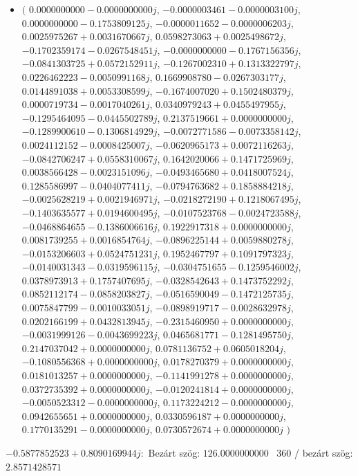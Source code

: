 \documentclass[14pt,a4paper]{article}
\begin{document}
\begin{itemize}
\item
$\big($
$0.0000000000-0.0000000000j$, $-0.0000003461-0.0000003100j$, $0.0000000000-0.1753809125j$, $-0.0000011652-0.0000006203j$, $0.0025975267+0.0031670667j$, $0.0598273063+0.0025498672j$, $-0.1702359174-0.0267548451j$, $-0.0000000000-0.1767156356j$, $-0.0841303725+0.0572152911j$, $-0.1267002310+0.1313322797j$, $0.0226462223-0.0050991168j$, $0.1669908780-0.0267303177j$, $0.0144891038+0.0053308599j$, $-0.1674007020+0.1502480379j$, $0.0000719734-0.0017040261j$, $0.0340979243+0.0455497955j$, $-0.1295464095-0.0445502789j$, $0.2137519661+0.0000000000j$, $-0.1289900610-0.1306814929j$, $-0.0072771586-0.0073358142j$, $0.0024112152-0.0008425007j$, $-0.0620965173+0.0072116263j$, $-0.0842706247+0.0558310067j$, $0.1642020066+0.1471725969j$, $0.0038566428-0.0023151096j$, $-0.0493465680+0.0418007524j$, $0.1285586997-0.0404077411j$, $-0.0794763682+0.1858884218j$, $-0.0025628219+0.0021946971j$, $-0.0218272190+0.1218067495j$, $-0.1403635577+0.0194600495j$, $-0.0107523768-0.0024723588j$, $-0.0468864655-0.1386006616j$, $0.1922917318+0.0000000000j$, $0.0081739255+0.0016854764j$, $-0.0896225144+0.0059880278j$, $-0.0153206603+0.0524751231j$, $0.1952467797+0.1091797323j$, $-0.0140031343-0.0319596115j$, $-0.0304751655-0.1259546002j$, $0.0378973913+0.1757407695j$, $-0.0328542643+0.1473752292j$, $0.0852112174-0.0858203827j$, $-0.0516590049-0.1472125735j$, $0.0075847799-0.0010033051j$, $-0.0898919717-0.0028632978j$, $0.0202166199+0.0432813945j$, $-0.2315460950+0.0000000000j$, $-0.0031999126-0.0043699223j$, $0.0465681771-0.1281495750j$, $0.2147037042+0.0000000000j$, $0.0781136752+0.0605018204j$, $-0.1080556368+0.0000000000j$, $0.0178270379+0.0000000000j$, $0.0181013257+0.0000000000j$, $-0.1141991278+0.0000000000j$, $0.0372735392+0.0000000000j$, $-0.0120241814+0.0000000000j$, $-0.0050523312-0.0000000000j$, $0.1173224212-0.0000000000j$, $0.0942655651+0.0000000000j$, $0.0330596187+0.0000000000j$, $0.1770135291-0.0000000000j$, $0.0730572674+0.0000000000j$
$\big)$
\end{itemize}
$-0.5877852523+0.8090169944j$:\
Bezárt szög: $126.0000000000$ \
360 / bezárt szög: $2.8571428571$\
\end{document}
